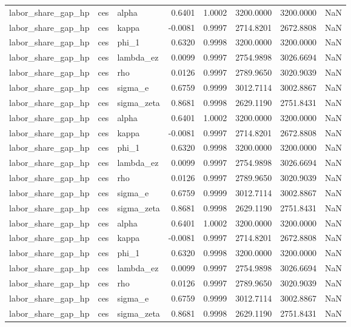 \begin{tabular}{lllrrrrl}
labor\_share\_gap\_hp & ces & alpha & 0.6401 & 1.0002 & 3200.0000 & 3200.0000 & NaN \\
labor\_share\_gap\_hp & ces & kappa & -0.0081 & 0.9997 & 2714.8201 & 2672.8808 & NaN \\
labor\_share\_gap\_hp & ces & phi\_1 & 0.6320 & 0.9998 & 3200.0000 & 3200.0000 & NaN \\
labor\_share\_gap\_hp & ces & lambda\_ez & 0.0099 & 0.9997 & 2754.9898 & 3026.6694 & NaN \\
labor\_share\_gap\_hp & ces & rho & 0.0126 & 0.9997 & 2789.9650 & 3020.9039 & NaN \\
labor\_share\_gap\_hp & ces & sigma\_e & 0.6759 & 0.9999 & 3012.7114 & 3002.8867 & NaN \\
labor\_share\_gap\_hp & ces & sigma\_zeta & 0.8681 & 0.9998 & 2629.1190 & 2751.8431 & NaN \\
labor\_share\_gap\_hp & ces & alpha & 0.6401 & 1.0002 & 3200.0000 & 3200.0000 & NaN \\
labor\_share\_gap\_hp & ces & kappa & -0.0081 & 0.9997 & 2714.8201 & 2672.8808 & NaN \\
labor\_share\_gap\_hp & ces & phi\_1 & 0.6320 & 0.9998 & 3200.0000 & 3200.0000 & NaN \\
labor\_share\_gap\_hp & ces & lambda\_ez & 0.0099 & 0.9997 & 2754.9898 & 3026.6694 & NaN \\
labor\_share\_gap\_hp & ces & rho & 0.0126 & 0.9997 & 2789.9650 & 3020.9039 & NaN \\
labor\_share\_gap\_hp & ces & sigma\_e & 0.6759 & 0.9999 & 3012.7114 & 3002.8867 & NaN \\
labor\_share\_gap\_hp & ces & sigma\_zeta & 0.8681 & 0.9998 & 2629.1190 & 2751.8431 & NaN \\
labor\_share\_gap\_hp & ces & alpha & 0.6401 & 1.0002 & 3200.0000 & 3200.0000 & NaN \\
labor\_share\_gap\_hp & ces & kappa & -0.0081 & 0.9997 & 2714.8201 & 2672.8808 & NaN \\
labor\_share\_gap\_hp & ces & phi\_1 & 0.6320 & 0.9998 & 3200.0000 & 3200.0000 & NaN \\
labor\_share\_gap\_hp & ces & lambda\_ez & 0.0099 & 0.9997 & 2754.9898 & 3026.6694 & NaN \\
labor\_share\_gap\_hp & ces & rho & 0.0126 & 0.9997 & 2789.9650 & 3020.9039 & NaN \\
labor\_share\_gap\_hp & ces & sigma\_e & 0.6759 & 0.9999 & 3012.7114 & 3002.8867 & NaN \\
labor\_share\_gap\_hp & ces & sigma\_zeta & 0.8681 & 0.9998 & 2629.1190 & 2751.8431 & NaN \\

\end{tabular}
